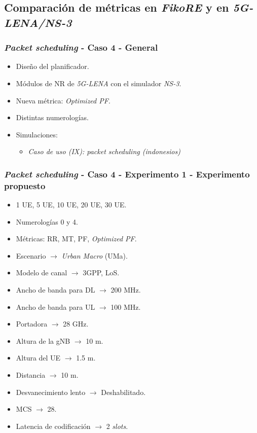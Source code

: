 \documentclass{beamer}
\begin{document}
\subsection{Comparación de métricas en \textit{FikoRE} y en \textit{5G-LENA/NS-3}}

\begin{frame}
\frametitle{\textit{Packet scheduling} - Caso 4 - General}

\begin{itemize}
\item Diseño del planificador.
\item Módulos de NR de \textit{5G-LENA} con el simulador \textit{NS-3}.
\item Nueva métrica: \textit{Optimized PF}.
\item Distintas numerologías.
\item {
	Simulaciones:
	\begin{itemize}
	\item \textit{Caso de uso (IX): packet scheduling (indonesios)}
	\end{itemize}
}
\end{itemize}
\end{frame}

\begin{frame}
\frametitle{\textit{Packet scheduling} - Caso 4 - Experimento 1 - Experimento propuesto}

\begin{itemize}
\item 1 UE, 5 UE, 10 UE, 20 UE, 30 UE.
\item Numerologías 0 y 4.
\item Métricas: RR, MT, PF, \textit{Optimized PF}.
\item
Escenario $\rightarrow$ \textit{Urban Macro} (UMa).
\item
Modelo de canal $\rightarrow$ 3GPP, LoS.
\item
Ancho de banda para DL $\rightarrow$ 200 MHz.
\item
Ancho de banda para UL $\rightarrow$ 100 MHz.
\item
Portadora $\rightarrow$ 28 GHz.
\item
Altura de la gNB $\rightarrow$ 10 m.
\item
Altura del UE $\rightarrow$ 1.5 m.
\item
Distancia $\rightarrow$ 10 m.
\item
Desvanecimiento lento $\rightarrow$ Deshabilitado.
\item
MCS $\rightarrow$ 28.
\item
Latencia de codificación $\rightarrow$ 2 \textit{slots}.
\end{itemize}
\end{frame}
\end{document}
